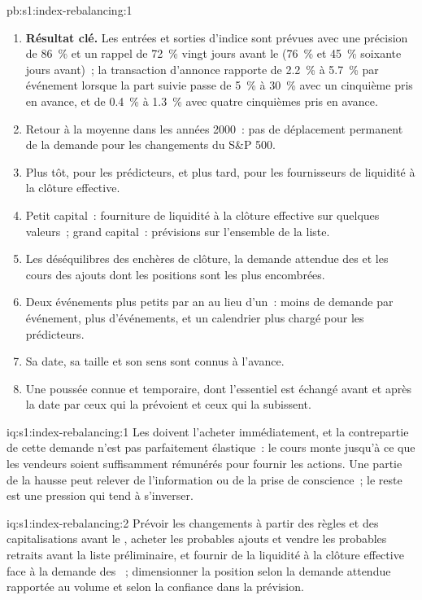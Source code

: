 \begin{solution}{pb:s1:index-rebalancing:1}
\begin{enumerate}
\item \textbf{Résultat clé.} Les entrées et sorties d'indice sont prévues avec une précision de 86~\% et un rappel de 72~\% vingt jours avant le  (76~\% et 45~\%
soixante jours avant)~; la transaction d'annonce rapporte de 2.2~\% à 5.7~\% par événement lorsque la part suivie passe de 5~\% à 30~\% avec un cinquième pris en avance, et de 0.4~\% à
1.3~\% avec quatre cinquièmes pris en avance.
\item Retour à la moyenne dans les années 2000~: pas de déplacement permanent de la demande pour les changements du S\&P 500.
\item Plus tôt, pour les prédicteurs, et plus tard, pour les fournisseurs de liquidité à la clôture effective.
\item Petit capital~: fourniture de liquidité à la clôture effective sur quelques valeurs~; grand capital~: prévisions sur l'ensemble de la liste.
\item Les déséquilibres des enchères de clôture, la demande attendue des  et les cours des ajouts dont les positions sont les plus encombrées.
\item Deux événements plus petits par an au lieu d'un~: moins de demande par événement, plus d'événements, et un calendrier plus chargé pour les prédicteurs.
\item Sa date, sa taille et son sens sont connus à l'avance.
\item Une poussée connue et temporaire, dont l'essentiel est échangé avant et après la date par ceux qui la prévoient et ceux qui la subissent.
\end{enumerate}
\end{solution}

\begin{solution}{iq:s1:index-rebalancing:1}
Les  doivent l'acheter immédiatement, et la contrepartie de cette demande n'est pas parfaitement élastique~: le cours monte jusqu'à ce que les vendeurs soient suffisamment rémunérés pour fournir les
actions. Une partie de la hausse peut relever de l'information ou de la prise de conscience~; le reste est une pression qui tend à s'inverser.
\end{solution}

\begin{solution}{iq:s1:index-rebalancing:2}
Prévoir les changements à partir des règles et des capitalisations avant le , acheter les probables ajouts et vendre les probables retraits avant la liste préliminaire, et
fournir de la liquidité à la clôture effective face à la demande des ~; dimensionner la position selon la demande attendue rapportée au volume et selon la confiance dans la
prévision.
\end{solution}

